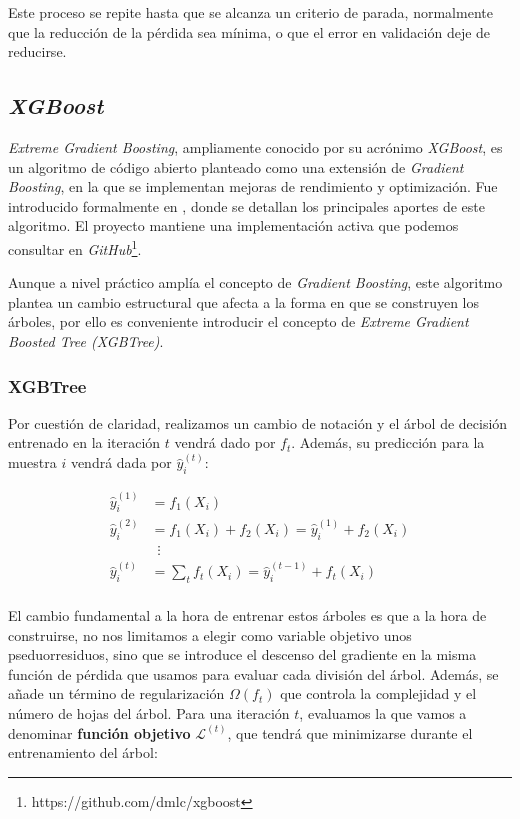 \documentclass[titlepage, 11pt]{book}
\begin{document}
Este proceso se repite hasta que se alcanza un criterio de parada, normalmente que la reducción de la pérdida sea mínima, o que el error en validación deje de reducirse.

\subsection{\textit{XGBoost}}
\textit{Extreme Gradient Boosting}, ampliamente conocido por su acrónimo \textit{XGBoost}, es un algoritmo de código abierto planteado como una extensión de \textit{Gradient Boosting}, en la que se implementan mejoras de rendimiento y optimización. Fue introducido formalmente en \cite{chen2016xgboost}, donde se detallan los principales aportes de este algoritmo. El proyecto mantiene una implementación activa que podemos consultar en \textit{GitHub}\footnote{https://github.com/dmlc/xgboost}.

Aunque a nivel práctico amplía el concepto de \textit{Gradient Boosting}, este algoritmo plantea un cambio estructural que afecta a la forma en que se construyen los árboles, por ello es conveniente introducir el concepto de \textit{Extreme Gradient Boosted Tree (XGBTree)}.

\subsubsection{XGBTree}
Por cuestión de claridad, realizamos un cambio de notación y el árbol de decisión entrenado en la iteración $t$ vendrá dado por $f_t$. Además, su predicción para la muestra $i$ vendrá dada por $\hat{y}^{(t)}_i$:

\begin{equation*}
    \begin{aligned}
        \hat{y}^{(1)}_i &=   f_1(X_i)\\
        \hat{y}^{(2)}_i &=  f_1(X_i)+f_2(X_i)   =   \hat{y}^{(1)}_i+f_2(X_i)\\
        &\,\,\,\vdots\\
        \hat{y}^{(t)}_i &=  \sum_{t}f_t(X_i)=   \hat{y}^{(t-1)}_i+f_t(X_i)\\
    \end{aligned}
\end{equation*}

El cambio fundamental a la hora de entrenar estos árboles es que a la hora de construirse, no nos limitamos a elegir como variable objetivo unos pseduorresiduos, sino que se introduce el descenso del gradiente en la misma función de pérdida que usamos para evaluar cada división del árbol. Además, se añade un término de regularización $\Omega(f_t)$ que controla la complejidad y el número de hojas del árbol. Para una iteración $t$, evaluamos la que vamos a denominar \textbf{función objetivo} $\mathcal{L}^{(t)}$, que tendrá que minimizarse durante el entrenamiento del árbol:
\end{document}
